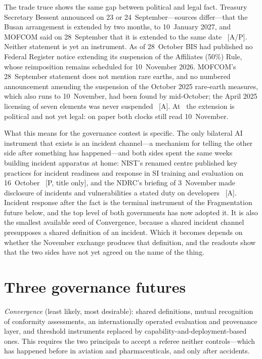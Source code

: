 The trade truce shows the same gap between political and legal fact. Treasury Secretary Bessent announced on 23 or 24~September---sources differ---that the Busan arrangement is extended by two months, to 10~January 2027, and MOFCOM said on 28~September that it is extended to the same date~\cite{gov-truce-legal} [A/P]. Neither statement is yet an instrument. As of 28~October BIS had published no Federal Register notice extending its suspension of the Affiliates (50\%) Rule, whose reimposition remains scheduled for 10~November 2026. MOFCOM's 28~September statement does not mention rare earths, and no numbered announcement amending the suspension of the October 2025 rare-earth measures, which also runs to 10~November, had been found by mid-October; the April 2025 licensing of seven elements was never suspended~\cite{gov-truce-legal} [A]. At \datafreeze\ the extension is political and not yet legal: on paper both clocks still read 10~November.

What this means for the governance contest is specific. The only bilateral AI instrument that exists is an incident channel---a mechanism for telling the other side after something has happened---and both sides spent the same weeks building incident apparatus at home: NIST's renamed centre published key practices for incident readiness and response in SI training and evaluation on 16~October~\cite{gov-caissi} [P, title only], and the NDRC's briefing of 3~November made disclosure of incidents and vulnerabilities a stated duty on developers~\cite{gov-ndrc-briefing} [A]. Incident response after the fact is the terminal instrument of the Fragmentation future below, and the top level of both governments has now adopted it. It is also the smallest available seed of Convergence, because a shared incident channel presupposes a shared definition of an incident. Which it becomes depends on whether the November exchange produces that definition, and the readouts show that the two sides have not yet agreed on the name of the thing.

\section{Three governance futures}

\emph{Convergence} (least likely, most desirable): shared definitions, mutual recognition of conformity assessments, an internationally operated evaluation and provenance layer, and threshold instruments replaced by capability-and-deployment-based ones. This requires the two principals to accept a referee neither controls---which has happened before in aviation and pharmaceuticals, and only after accidents.

